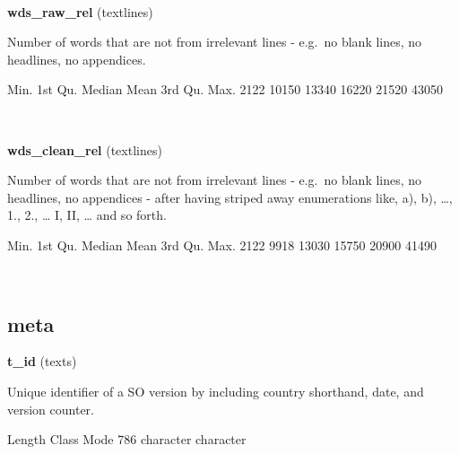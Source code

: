 \documentclass[]{article}
\newenvironment{Shaded}{\begin{snugshade}}{\end{snugshade}}
\newcommand{\DecValTok}[1]{\textcolor[rgb]{0.00,0.00,0.81}{{#1}}}
\newcommand{\NormalTok}[1]{{#1}}
\begin{document}
~

\vspace{1em}

\textbf{wds\_raw\_rel} (textlines)

Number of words that are not from irrelevant lines - e.g.~no blank
lines, no headlines, no appendices.

\begin{Shaded}
\begin{Highlighting}[]
   \NormalTok{Min. 1st Qu.  Median    Mean 3rd Qu.    Max. }
   \DecValTok{2122}   \DecValTok{10150}   \DecValTok{13340}   \DecValTok{16220}   \DecValTok{21520}   \DecValTok{43050} 
\end{Highlighting}
\end{Shaded}

~

\vspace{1em}

\textbf{wds\_clean\_rel} (textlines)

Number of words that are not from irrelevant lines - e.g.~no blank
lines, no headlines, no appendices - after having striped away
enumerations like, a), b), \ldots{}, 1., 2., \ldots{} I, II, \ldots{}
and so forth.

\begin{Shaded}
\begin{Highlighting}[]
   \NormalTok{Min. 1st Qu.  Median    Mean 3rd Qu.    Max. }
   \DecValTok{2122}    \DecValTok{9918}   \DecValTok{13030}   \DecValTok{15750}   \DecValTok{20900}   \DecValTok{41490} 
\end{Highlighting}
\end{Shaded}

~

\vspace{1em}

\subsection{meta}\label{meta}

\textbf{t\_id} (texts)

Unique identifier of a SO version by including country shorthand, date,
and version counter.

\begin{Shaded}
\begin{Highlighting}[]
   \NormalTok{Length     Class      Mode }
      \DecValTok{786} \NormalTok{character character }
\end{Highlighting}
\end{Shaded}
\end{document}

